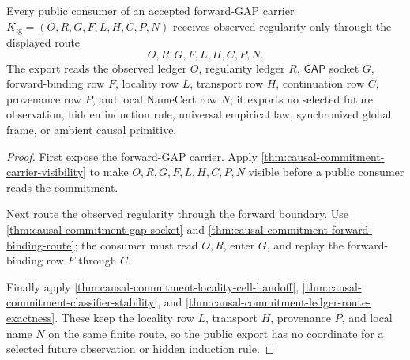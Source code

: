 \begin{theorem}
\label{thm:causal-commitment-public-forward-gap-export}
Every public consumer of an accepted forward-GAP carrier $K_{\mathrm{fg}}=(O,R,G,F,L,H,C,P,N)$ receives observed regularity only through the displayed route
$$
O,R,G,F,L,H,C,P,N.
$$
The export reads the observed ledger $O$, regularity ledger $R$, $\mathsf{GAP}$ socket $G$, forward-binding row $F$, locality row $L$, transport row $H$, continuation row $C$, provenance row $P$, and local NameCert row $N$; it exports no selected future observation, hidden induction rule, universal empirical law, synchronized global frame, or ambient causal primitive.
\end{theorem}
\begin{proof}
First expose the forward-GAP carrier. Apply \autoref{thm:causal-commitment-carrier-visibility} to make $O,R,G,F,L,H,C,P,N$ visible before a public consumer reads the commitment.

Next route the observed regularity through the forward boundary. Use \autoref{thm:causal-commitment-gap-socket} and \autoref{thm:causal-commitment-forward-binding-route}; the consumer must read $O,R$, enter $G$, and replay the forward-binding row $F$ through $C$.

Finally apply \autoref{thm:causal-commitment-locality-cell-handoff}, \autoref{thm:causal-commitment-classifier-stability}, and \autoref{thm:causal-commitment-ledger-route-exactness}. These keep the locality row $L$, transport $H$, provenance $P$, and local name $N$ on the same finite route, so the public export has no coordinate for a selected future observation or hidden induction rule.
\end{proof}


